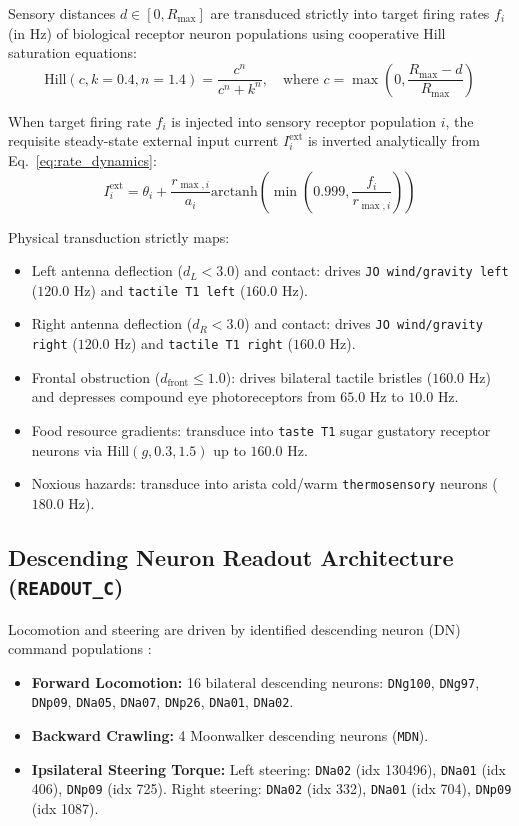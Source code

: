 \documentclass[10pt,letterpaper]{article}
\begin{document}
Sensory distances $d \in [0, R_{\max}]$ are transduced strictly into target firing rates $f_i$ (in Hz) of biological receptor neuron populations using cooperative Hill saturation equations:
\begin{equation}
\text{Hill}(c, k=0.4, n=1.4) = \frac{c^n}{c^n + k^n}, \quad \text{where } c = \max\left(0, \frac{R_{\max} - d}{R_{\max}}\right)
\end{equation}

When target firing rate $f_i$ is injected into sensory receptor population $i$, the requisite steady-state external input current $I_i^{\text{ext}}$ is inverted analytically from Eq.~\ref{eq:rate_dynamics}:
\begin{equation}
I_i^{\text{ext}} = \theta_i + \frac{r_{\max,i}}{a_i} \text{arctanh}\left(\min\left(0.999, \frac{f_i}{r_{\max,i}}\right)\right)
\end{equation}

Physical transduction strictly maps:
\begin{itemize}
    \item Left antenna deflection ($d_L < 3.0$) and contact: drives \texttt{JO wind/gravity left} ($120.0\text{ Hz}$) and \texttt{tactile T1 left} ($160.0\text{ Hz}$).
    \item Right antenna deflection ($d_R < 3.0$) and contact: drives \texttt{JO wind/gravity right} ($120.0\text{ Hz}$) and \texttt{tactile T1 right} ($160.0\text{ Hz}$).
    \item Frontal obstruction ($d_{\text{front}} \le 1.0$): drives bilateral tactile bristles ($160.0\text{ Hz}$) and depresses compound eye photoreceptors from $65.0\text{ Hz}$ to $10.0\text{ Hz}$.
    \item Food resource gradients: transduce into \texttt{taste T1} sugar gustatory receptor neurons via $\text{Hill}(g, 0.3, 1.5)$ up to $160.0\text{ Hz}$.
    \item Noxious hazards: transduce into arista cold/warm \texttt{thermosensory} neurons ($180.0\text{ Hz}$).
\end{itemize}

\subsection{Descending Neuron Readout Architecture (\texttt{READOUT\_C})}

Locomotion and steering are driven by identified descending neuron (DN) command populations \cite{rayshubskiy2020neural, bidaye2020two, bidaye2020locomotor}:
\begin{itemize}
    \item \textbf{Forward Locomotion:} 16 bilateral descending neurons: \texttt{DNg100}, \texttt{DNg97}, \texttt{DNp09}, \texttt{DNa05}, \texttt{DNa07}, \texttt{DNp26}, \texttt{DNa01}, \texttt{DNa02}.
    \item \textbf{Backward Crawling:} 4 Moonwalker descending neurons (\texttt{MDN}).
    \item \textbf{Ipsilateral Steering Torque:} Left steering: \texttt{DNa02} (idx 130496), \texttt{DNa01} (idx 406), \texttt{DNp09} (idx 725). Right steering: \texttt{DNa02} (idx 332), \texttt{DNa01} (idx 704), \texttt{DNp09} (idx 1087).
\end{itemize}
\end{document}
